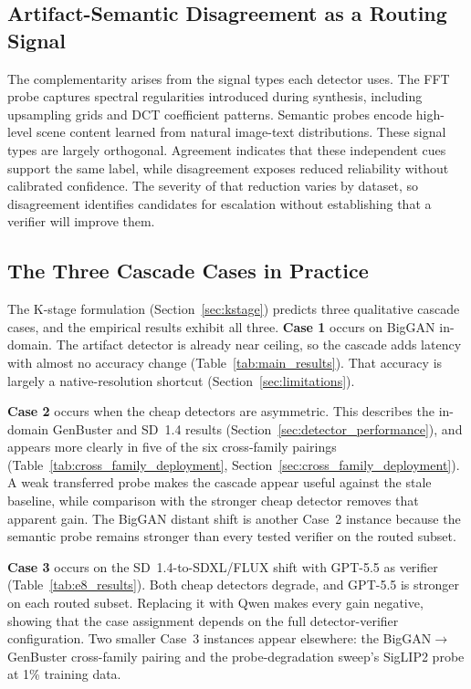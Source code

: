 \documentclass{ieeeaccess}
\begin{document}
\subsection{Artifact-Semantic Disagreement as a Routing Signal}

The complementarity arises from the signal types each detector uses. The FFT probe
captures spectral regularities introduced during synthesis, including upsampling grids
and DCT coefficient patterns. Semantic probes encode high-level scene content learned
from natural image-text distributions. These signal types are largely orthogonal.
Agreement indicates that these independent cues support the same label, while
disagreement exposes reduced reliability without calibrated confidence. The severity of
that reduction varies by dataset, so disagreement identifies candidates for escalation
without establishing that a verifier will improve them.

\subsection{The Three Cascade Cases in Practice}
\label{sec:three_cases}

The K-stage formulation (Section~\ref{sec:kstage}) predicts three qualitative cascade cases, and
the empirical results exhibit all three. \textbf{Case 1} occurs on BigGAN in-domain.
The artifact detector is already near ceiling, so the cascade adds latency with almost
no accuracy change (Table~\ref{tab:main_results}). That accuracy is largely a native-resolution shortcut (Section~\ref{sec:limitations}).

\textbf{Case 2} occurs when the cheap detectors are asymmetric. This describes the
in-domain GenBuster and SD~1.4 results (Section~\ref{sec:detector_performance}), and appears more clearly in five of
the six cross-family pairings (Table~\ref{tab:cross_family_deployment},
Section~\ref{sec:cross_family_deployment}). A weak transferred probe makes the cascade appear useful against the
stale baseline, while comparison with the stronger cheap detector removes that apparent
gain. The BigGAN distant shift is another Case~2 instance because the semantic probe
remains stronger than every tested verifier on the routed subset.

\textbf{Case 3} occurs on the SD~1.4-to-SDXL/FLUX shift with GPT-5.5 as verifier
(Table~\ref{tab:e8_results}). Both cheap detectors degrade, and GPT-5.5 is stronger on
each routed subset. Replacing it with Qwen makes every gain negative, showing that the
case assignment depends on the full detector-verifier configuration. Two smaller Case~3
instances appear elsewhere: the BigGAN$\to$GenBuster cross-family pairing and the
probe-degradation sweep's SigLIP2 probe at 1\% training data.
\end{document}
